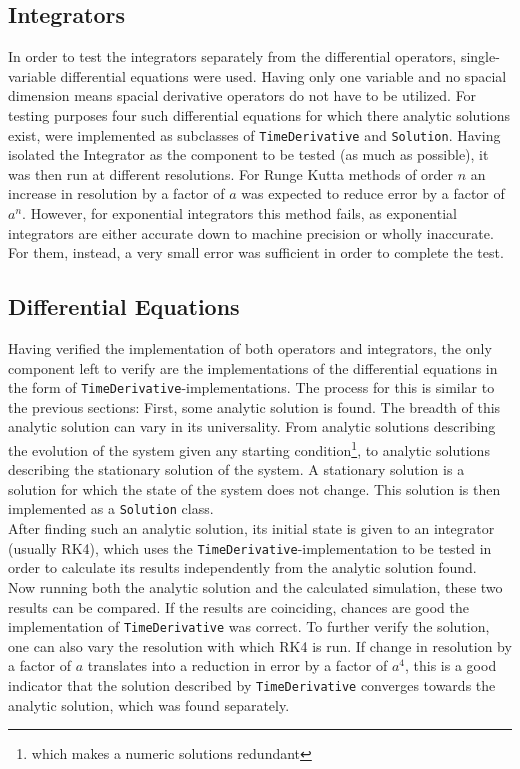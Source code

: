 \subsection{Integrators}
In order to test the integrators separately from the differential operators, single-variable differential equations were used.
Having only one variable and no spacial dimension means spacial derivative operators do not have to be utilized.
For testing purposes four such differential equations for which there analytic solutions exist, were implemented as subclasses of  \texttt{TimeDerivative} and \texttt{Solution}.
Having isolated the Integrator as the component to be tested (as much as possible), it was then run at different resolutions.
For Runge Kutta methods of order $n$ an increase in resolution by a factor of $a$ was expected to reduce error by a factor of $a^n$.
However, for exponential integrators this method fails, as exponential integrators are either accurate down to machine precision or wholly inaccurate.
For them, instead, a very small error was sufficient in order to complete the test.

\subsection{Differential Equations}
Having verified the implementation of both operators and integrators, the only component left to verify are the implementations of the differential equations in the form of \texttt{TimeDerivative}-implementations.
The process for this is similar to the previous sections: First, some analytic solution is found.
The breadth of this analytic solution can vary in its universality.
From analytic solutions describing the evolution of the system given any starting condition\footnote{which makes a numeric solutions redundant}, to analytic solutions describing the stationary solution of the system.
A stationary solution is a solution for which the state of the system does not change.
This solution is then implemented as a \texttt{Solution} class.
\\
After finding such an analytic solution, its initial state is given to an integrator (usually RK4), which uses the \texttt{TimeDerivative}-implementation to be tested in order to calculate its results independently from the analytic solution found.
\\
Now running both the analytic solution and the calculated simulation, these two results can be compared.
If the results are coinciding, chances are good the implementation of \texttt{TimeDerivative} was correct.
To further verify the solution, one can also vary the resolution with which RK4 is run.
If change in resolution by a factor of $a$ translates into a reduction in error by a factor of $a^4$, this is a good indicator that the solution described by \texttt{TimeDerivative} converges towards the analytic solution, which was found separately.